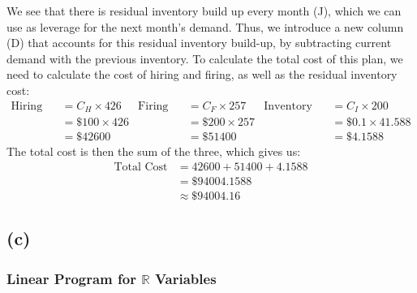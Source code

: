 \documentclass[12pt]{article}
\begin{document}
\noindent We see that there is residual inventory build up every month (J), which we can use as leverage for the next month's demand. Thus, we introduce a new column (D) that accounts for this residual inventory build-up, by subtracting current demand with the previous inventory. To calculate the total cost of this plan, we need to calculate the cost of hiring and firing, as well as the residual inventory cost: \begin{align*}
    \text{Hiring Cost} &= C_H \times 426 & \text{Firing Cost} &= C_F \times 257 & \text{Inventory Cost} &= C_I \times 200 \\ 
    &= \$ 100 \times 426 & &=\$ 200 \times 257 & &= \$ 0.1 \times 41.588 \\ 
    &= \$ 42600 & &=\$ 51400 & &=\$ 4.1588
\end{align*} The total cost is then the sum of the three, which gives us: \begin{align*}
    \text{Total Cost} &= 42600 + 51400 + 4.1588 \\ 
    &= \$ 94004.1588 \\ 
    &\approx \boxed{\$ 94004.16}
\end{align*}

\subsection*{(c)}   

\subsubsection*{Linear Program for $ \mathbb{R}$ Variables}
\end{document}
